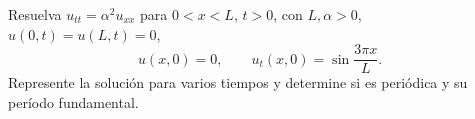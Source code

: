 Resuelva $u_{tt}=\alpha^2u_{xx}$ para $0<x<L$, $t>0$, con $L,\alpha>0$, $u(0,t)=u(L,t)=0$, \[u(x,0)=0,\qquad u_t(x,0)=\sin\frac{3\pi x}{L}.\] Represente la solución para varios tiempos y determine si es periódica y su período fundamental.
